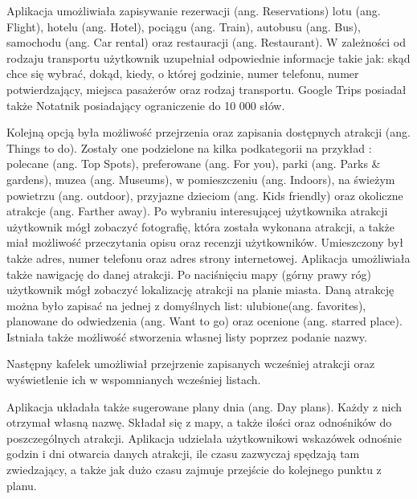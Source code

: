 \documentclass[10pt,twoside,a4paper]{report}
\begin{document}
\par Aplikacja umożliwiała zapisywanie rezerwacji (ang. Reservations) lotu (ang. Flight), hotelu (ang. Hotel), pociągu (ang. Train), autobusu (ang. Bus), samochodu (ang. Car rental) oraz restauracji (ang. Restaurant). W zależności od rodzaju transportu użytkownik uzupełniał odpowiednie informacje takie jak: skąd chce się wybrać, dokąd, kiedy, o której godzinie, numer telefonu, numer potwierdzający, miejsca pasażerów oraz rodzaj transportu. Google Trips posiadał także Notatnik posiadający ograniczenie do 10 000 słów.
\par Kolejną opcją była możliwość przejrzenia oraz zapisania dostępnych atrakcji (ang. Things to do). Zostały one podzielone na kilka podkategorii na przykład : polecane (ang. Top Spots), preferowane (ang. For you), parki (ang. Parks \& gardens), muzea (ang. Museums), w pomieszczeniu (ang. Indoors), na świeżym powietrzu (ang. outdoor), przyjazne dzieciom (ang. Kids friendly) oraz okoliczne atrakcje (ang. Farther away). Po wybraniu interesującej użytkownika atrakcji użytkownik mógł zobaczyć fotografię, która została wykonana atrakcji, a także miał możliwość przeczytania opisu oraz recenzji użytkowników. Umieszczony był także adres, numer telefonu oraz adres strony internetowej. Aplikacja umożliwiała także nawigację do danej atrakcji. Po naciśnięciu mapy (górny prawy róg) użytkownik mógł zobaczyć lokalizację atrakcji na planie miasta. Daną atrakcję można było zapisać na jednej z domyślnych list: ulubione(ang. favorites), planowane do odwiedzenia (ang. Want to go) oraz ocenione (ang. starred place). Istniała także możliwość stworzenia własnej listy poprzez podanie nazwy.

\par Następny kafelek umożliwiał przejrzenie zapisanych wcześniej atrakcji oraz wyświetlenie ich w wspomnianych wcześniej listach.

\par Aplikacja układała także sugerowane plany dnia (ang. Day plans). Każdy z nich otrzymał własną nazwę. Składał się z mapy, a także ilości oraz odnośników do poszczególnych atrakcji. Aplikacja udzielała użytkownikowi wskazówek odnośnie godzin i dni otwarcia danych atrakcji, ile czasu zazwyczaj spędzają tam zwiedzający, a także jak dużo czasu zajmuje przejście do kolejnego punktu z planu.
\end{document}
